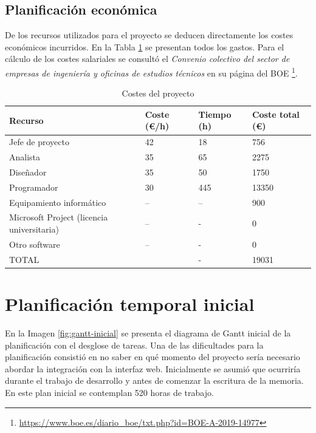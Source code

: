 \subsection{Planificación económica}

De los recursos utilizados para el proyecto se deducen directamente los costes económicos incurridos. En la Tabla \ref{tab:costes-proyecto} se presentan todos los gastos. Para el cálculo de los costes salariales se consultó el \emph{Convenio colectivo del sector de empresas de ingeniería y oficinas de estudios técnicos} en su página del BOE \footnote{\url{https://www.boe.es/diario_boe/txt.php?id=BOE-A-2019-14977}}.

\begin{table}[ht]
    \centering
    \begin{tabular}{l l l l}
        Recurso & Coste (€/h) & Tiempo (h) & Coste total (€) \\
        \hline
        \hline
        Jefe de proyecto & 42 & 18 & 756 \\
        Analista & 35 & 65 & 2275 \\
        Diseñador & 35 & 50 & 1750 \\
        Programador & 30 & 445 & 13350 \\
        Equipamiento informático & -- & -- & 900 \\
        Microsoft Project (licencia universitaria) & -- & - & 0 \\
		Otro software & -- & - & 0 \\    
        \hline
        \hline
        TOTAL & & - & 19031 \\        
    \end{tabular}
	\caption{Costes del proyecto}    
	\label{tab:costes-proyecto}
\end{table}

\section{Planificación temporal inicial}

En la Imagen \ref{fig:gantt-inicial} se presenta el diagrama de Gantt inicial de la planificación con el desglose de tareas. Una de las dificultades para la planificación consistió en no saber en qué momento del proyecto sería necesario abordar la integración con la interfaz web. Inicialmente se asumió que ocurriría durante el trabajo de desarrollo y antes de comenzar la escritura de la memoria. En este plan inicial se contemplan 520 horas de trabajo.

